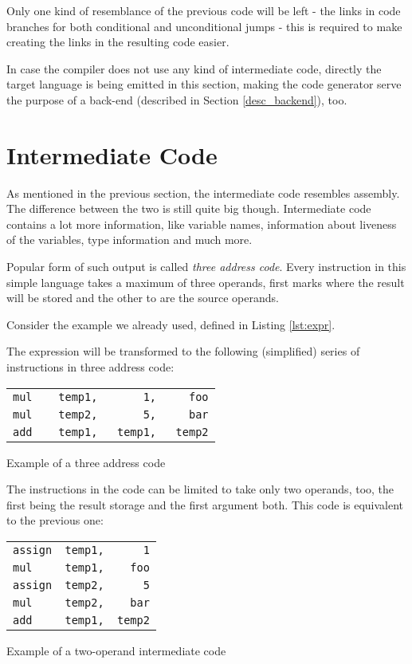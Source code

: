             Only one kind of resemblance of the previous code will be left - the links in code branches for both conditional and unconditional jumps - this is required to make creating the links in the resulting code easier.

            In case the compiler does not use any kind of intermediate code, directly the target language is being emitted in this section, making the code generator serve the purpose of a back-end (described in Section \ref{desc_backend}), too.

    \section{Intermediate Code}

            As mentioned in the previous section, the intermediate code resembles assembly. The difference between the two is still quite big though. Intermediate code contains a lot more information, like variable names, information about liveness of the variables, type information and much more.

            Popular form of such output is called \emph{three address code}. Every instruction in this simple language takes a maximum of three operands, first marks where the result will be stored and the other to are the source operands.\cite{DragonBook}

            Consider the example we already used, defined in Listing \ref{lst:expr}.

            The expression will be transformed to the following (simplified) series of instructions in three address code:

            \begin{listing}\centering\begin{tabular}{l}
            \verb|mul    temp1,       1,     foo|\\
            \verb|mul    temp2,       5,     bar|\\
            \verb|add    temp1,   temp1,   temp2|
            \end{tabular}
            \caption{Example of a three address code}\label{lst:tac}
            \end{listing}

            The instructions in the code can be limited to take only two operands, too, the first being the result storage and the first argument both. This code is equivalent to the previous one:

            \begin{listing}\centering\begin{tabular}{l}
            \verb|assign  temp1,      1|\\
            \verb|mul     temp1,    foo|\\
            \verb|assign  temp2,      5|\\
            \verb|mul     temp2,    bar|\\
            \verb|add     temp1,  temp2|\\
            \end{tabular}
            \caption{Example of a two-operand intermediate code}\label{lst:2ic}
            \end{listing}

